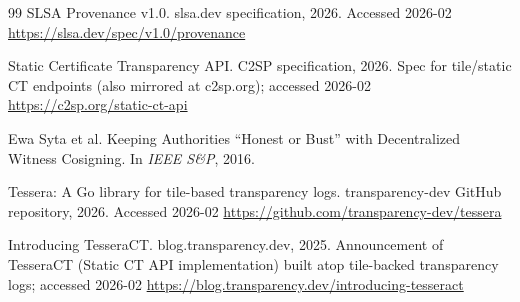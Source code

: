 \documentclass[11pt]{article}
\begin{document}
\begin{thebibliography}{99}
\newblock SLSA Provenance v1.0.
\newblock slsa.dev specification, 2026.
\newblock Accessed 2026-02
\newblock \url{https://slsa.dev/spec/v1.0/provenance}

\newblock Static Certificate Transparency API.
\newblock C2SP specification, 2026.
\newblock Spec for tile/static CT endpoints (also mirrored at c2sp.org); accessed 2026-02
\newblock \url{https://c2sp.org/static-ct-api}

Ewa Syta et al.
\newblock Keeping Authorities ``Honest or Bust'' with Decentralized Witness Cosigning.
\newblock In \emph{IEEE S\&P}, 2016.

\newblock Tessera: A Go library for tile-based transparency logs.
\newblock transparency-dev GitHub repository, 2026.
\newblock Accessed 2026-02
\newblock \url{https://github.com/transparency-dev/tessera}

\newblock Introducing TesseraCT.
\newblock blog.transparency.dev, 2025.
\newblock Announcement of TesseraCT (Static CT API implementation) built atop tile-backed transparency logs; accessed 2026-02
\newblock \url{https://blog.transparency.dev/introducing-tesseract}

\end{thebibliography}
\end{document}
